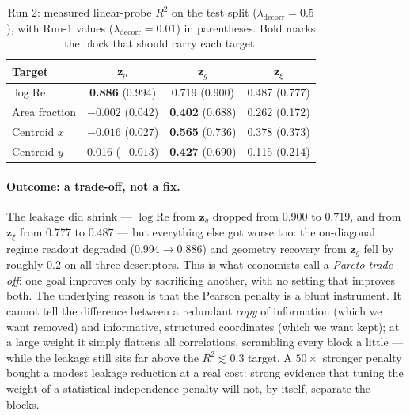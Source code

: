 \documentclass[11pt]{article}
\begin{document}
\begin{table}[htbp]
  \centering
  \caption{Run 2: measured linear-probe $R^2$ on the test split
  ($\lambda_{\mathrm{decorr}} = 0.5$), with Run-1 values
  ($\lambda_{\mathrm{decorr}} = 0.01$) in parentheses. Bold marks the
  block that should carry each target.}
  \label{tab:probes-run2}
  \begin{tabular}{lccc}
    \toprule
    Target & $\boldsymbol{z}_{\mu}$ & $\boldsymbol{z}_{g}$ & $\boldsymbol{z}_{\xi}$ \\
    \midrule
    $\log \mathrm{Re}$ & \textbf{0.886} (0.994) & 0.719 (0.900) & 0.487 (0.777) \\
    Area fraction      & $-0.002$ (0.042)       & \textbf{0.402} (0.688) & 0.262 (0.172) \\
    Centroid $x$       & $-0.016$ (0.027)       & \textbf{0.565} (0.736) & 0.378 (0.373) \\
    Centroid $y$       & 0.016 ($-0.013$)       & \textbf{0.427} (0.690) & 0.115 (0.214) \\
    \bottomrule
  \end{tabular}
\end{table}

\paragraph{Outcome: a trade-off, not a fix.} The leakage did shrink ---
$\log \mathrm{Re}$ from $\boldsymbol{z}_{g}$ dropped from $0.900$ to
$0.719$, and from $\boldsymbol{z}_{\xi}$ from $0.777$ to $0.487$ --- but
everything else got worse too: the on-diagonal regime readout degraded
($0.994 \to 0.886$) and geometry recovery from $\boldsymbol{z}_{g}$ fell
by roughly $0.2$ on all three descriptors. This is what economists call a
\emph{Pareto trade-off}: one goal improves only by sacrificing another,
with no setting that improves both. The underlying reason is that the
Pearson penalty is a blunt instrument. It cannot tell the difference
between a redundant \emph{copy} of information (which we want removed)
and informative, structured coordinates (which we want kept); at a large
weight it simply flattens all correlations, scrambling every block a
little --- while the leakage still sits far above the $R^2 \lesssim 0.3$
target. A $50\times$ stronger penalty bought a modest leakage reduction
at a real cost: strong evidence that tuning the weight of a statistical
independence penalty will not, by itself, separate the blocks.
\end{document}
